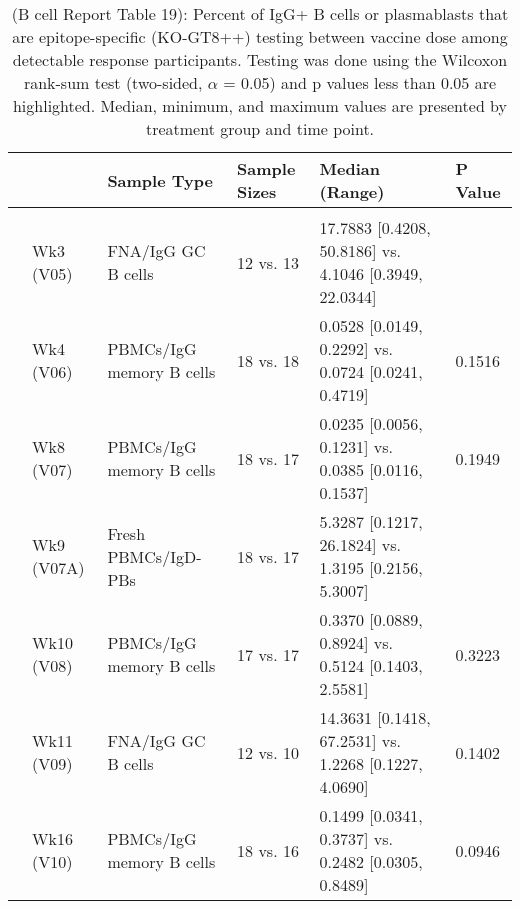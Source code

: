 \documentclass[
]{article}
\author{}
\date{\vspace{-2.5em}}
\begin{document}
\begin{table}[!h]

\caption[ (B cell Report Table 19): Percent of IgG+ B cells or plasmablasts that are epitope-specific (KO-GT8++) testing between vaccine dose among detectable response participantst]{\label{tab:bcell-tab-19}(B cell Report Table 19): Percent of IgG+ B cells or plasmablasts that are epitope-specific (KO-GT8++) testing between vaccine dose among detectable response participants. Testing was done using the Wilcoxon rank-sum test (two-sided, $\alpha$ = 0.05) and p values less than 0.05 are highlighted. Median, minimum, and maximum values are presented by treatment group and time point.}
\centering
\fontsize{7.5}{9.5}\selectfont
\begin{tabular}[t]{llllll}
\toprule
 &  & Sample Type & Sample Sizes & Median (Range) & P Value\\
\midrule
\addlinespace[0.3em]
\multicolumn{6}{l}{\textbf{20µg vs. 100µg}}\\
\hspace{1em} & Wk3 (V05) & FNA/IgG GC B cells & 12 vs. 13 & 17.7883 [0.4208, 50.8186] vs. 4.1046 [0.3949, 22.0344] & \cellcolor{yellow}{0.0114}\\
\cmidrule{2-6}
\hspace{1em} & Wk4 (V06) & PBMCs/IgG memory B cells & 18 vs. 18 & 0.0528 [0.0149, 0.2292] vs. 0.0724 [0.0241, 0.4719] & 0.1516\\
\cmidrule{2-6}
\hspace{1em} & Wk8 (V07) & PBMCs/IgG memory B cells & 18 vs. 17 & 0.0235 [0.0056, 0.1231] vs. 0.0385 [0.0116, 0.1537] & 0.1949\\
\cmidrule{2-6}
\hspace{1em} & Wk9 (V07A) & Fresh PBMCs/IgD- PBs & 18 vs. 17 & 5.3287 [0.1217, 26.1824] vs. 1.3195 [0.2156, 5.3007] & \cellcolor{yellow}{0.0043}\\
\cmidrule{2-6}
\hspace{1em} & Wk10 (V08) & PBMCs/IgG memory B cells & 17 vs. 17 & 0.3370 [0.0889, 0.8924] vs. 0.5124 [0.1403, 2.5581] & 0.3223\\
\cmidrule{2-6}
\hspace{1em} & Wk11 (V09) & FNA/IgG GC B cells & 12 vs. 10 & 14.3631 [0.1418, 67.2531] vs. 1.2268 [0.1227, 4.0690] & 0.1402\\
\cmidrule{2-6}
\hspace{1em} & Wk16 (V10) & PBMCs/IgG memory B cells & 18 vs. 16 & 0.1499 [0.0341, 0.3737] vs. 0.2482 [0.0305, 0.8489] & 0.0946\\
\bottomrule
\end{tabular}
\end{table}
\end{document}
